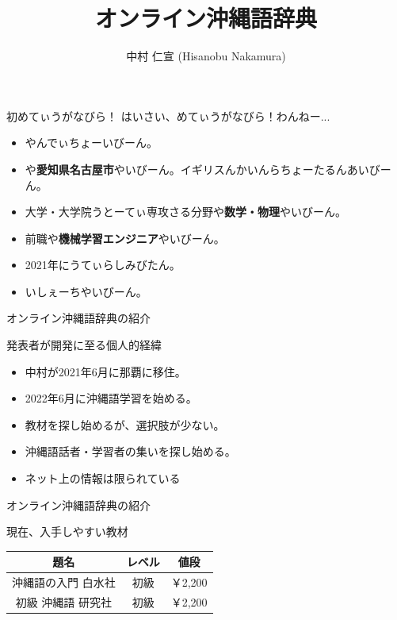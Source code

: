 \documentclass[14pt]{beamer}
\title{オンライン沖縄語辞典}
\author{中村 仁宣 (Hisanobu Nakamura)}
\begin{document}
\begin{frame}
  \maketitle  
\end{frame}

\begin{frame}{初めてぃうがなびら！}
  はいさい、めてぃうがなびら！わんねー...
    \begin{itemize}
    \item {}や\textbf{}んでぃちょーいびーん。
    \item {}や\textbf{愛知県名古屋市}やいびーん。イギリスんかいんらちょーたるんあいびーん。
    \item 大学・大学院うとーてぃ専攻さる分野や\textbf{数学・物理}やいびーん。
    \item 前職や\textbf{機械学習エンジニア}やいびーん。
    \item 2021年にうてぃらしみびたん。
    \item {}いしぇーちやいびーん。
    \end{itemize}
\end{frame}

\begin{frame}{オンライン沖縄語辞典の紹介}
  \begin{block}{発表者が開発に至る個人的経緯}
    \begin{itemize}
    \item  中村が2021年6月に那覇に移住。
    \item  2022年6月に沖縄語学習を始める。
    \item  教材を探し始めるが、選択肢が少ない。
    \item  沖縄語話者・学習者の集いを探し始める。
    \item  ネット上の情報は限られている
    \end{itemize}
  \end{block}
\end{frame}

\begin{frame}{オンライン沖縄語辞典の紹介}
  \begin{block}{現在、入手しやすい教材}
    \begin{table}[ht]
      \begin{tabular}{|c|c|c|} 
        \hline
        題名 & レベル & 値段  \\ [0.5ex] 
        \hline\hline
        沖縄語の入門 白水社 & 初級 & ￥2,200  \\ 
        \hline
        初級 沖縄語 研究社 & 初級 & ￥2,200  \\ 
        \hline
        \hline
      \end{tabular}
    \end{table}
  \end{block}
\end{frame}
\end{document}
